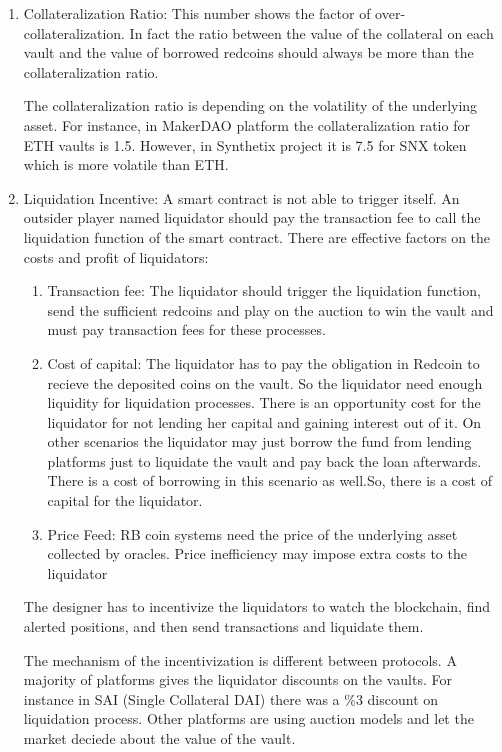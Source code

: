 \begin{enumerate}
  \item Collateralization Ratio:
  This number shows the factor of over-collateralization. In fact the ratio between the value of the collateral on each vault and the value of borrowed redcoins should always be more than the collateralization ratio.
  
The collateralization ratio is depending on the volatility of the underlying asset. For instance, in MakerDAO platform the collateralization ratio for ETH vaults is 1.5. However, in Synthetix project it is 7.5 for SNX token which is more volatile than ETH.
  \item Liquidation Incentive:
A smart contract is not able to trigger itself. An outsider player named liquidator should pay the transaction fee to call the liquidation function of the smart contract. There are effective factors on the costs and profit of liquidators:
\begin{enumerate}
	\item Transaction fee:
	The liquidator should trigger the liquidation function, send the sufficient redcoins and play on the auction to win the vault and must pay transaction fees for these processes.
	\item Cost of capital: The liquidator has to pay the obligation in Redcoin to recieve the deposited coins on the vault. So the liquidator need enough liquidity for liquidation processes. There is an opportunity cost for the liquidator for not lending her capital and gaining interest out of it. On other scenarios the liquidator may just borrow the fund from lending platforms just to liquidate the vault and pay back the loan afterwards. There is a cost of borrowing in this scenario as well.So, there is a cost of capital for the liquidator.
	\item Price Feed: RB coin systems need the price of the underlying asset collected by oracles. Price inefficiency may impose extra costs to the liquidator
\end{enumerate}  

The designer has to incentivize the liquidators to watch the blockchain, find alerted positions, and then send transactions and liquidate them. 

The mechanism of the incentivization is different between protocols. A majority of platforms gives the liquidator discounts on the vaults. For instance in SAI (Single Collateral DAI) there was a \%3 discount on liquidation process. Other platforms are using auction models and let the market deciede about the value of the vault. 
  

\end{enumerate}

